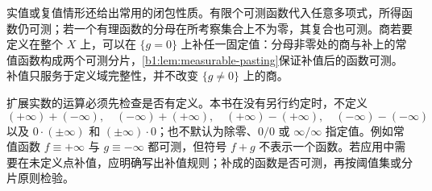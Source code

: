 实值或复值情形还给出常用的闭包性质。有限个可测函数代入任意多项式，所得函数仍可测；若一个有理函数的分母在所考察集合上不为零，其复合也可测。商若要定义在整个 \(X\) 上，可以在 \(\{g=0\}\) 上补任一固定值：分母非零处的商与补上的常值函数构成两个可测分片，\cref{b1:lem:measurable-pasting}保证补值后的函数可测。补值只服务于定义域完整性，并不改变 \(\{g\ne0\}\) 上的商。

\ProseParagraphBreak

扩展实数的运算必须先检查是否有定义。本书在没有另行约定时，不定义
\[
(+\infty)+(-\infty),\quad
(-\infty)+(+\infty),\quad
(+\infty)-(+\infty),\quad
(-\infty)-(-\infty)
\]
以及 \(0\cdot(\pm\infty)\) 和 \((\pm\infty)\cdot0\)；也不默认为除零、\(0/0\) 或 \(\infty/\infty\) 指定值。例如常值函数 \(f\equiv+\infty\) 与 \(g\equiv-\infty\) 都可测，但符号 \(f+g\) 不表示一个函数。若应用中需要在未定义点补值，应明确写出补值规则；补成的函数是否可测，再按阈值集或分片原则检验。
